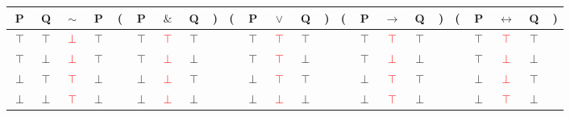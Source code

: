 \documentclass[11pt]{article}
\begin{document}
\begin{tabular}{ c  c | c  c | c  c  c  c  c | c  c  c  c  c | c  c  c  c  c | c  c  c  c  c }
P & Q & $\sim$ & P & ( & P & $\&$ & Q & ) & ( & P & $\lor$ & Q & ) & ( & P & $\rightarrow$ & Q & ) & ( & P & $\leftrightarrow$ & Q & )\\
\hline 
$\top$ & $\top$ & \textcolor{red}{$\perp$} & $\top$ &  & $\top$ & \textcolor{red}{$\top$} & $\top$ &  &  & $\top$ & \textcolor{red}{$\top$} & $\top$ &  &  & $\top$ & \textcolor{red}{$\top$} & $\top$ &  &  & $\top$ & \textcolor{red}{$\top$} & $\top$ & \\
$\top$ & $\perp$ & \textcolor{red}{$\perp$} & $\top$ &  & $\top$ & \textcolor{red}{$\perp$} & $\perp$ &  &  & $\top$ & \textcolor{red}{$\top$} & $\perp$ &  &  & $\top$ & \textcolor{red}{$\perp$} & $\perp$ &  &  & $\top$ & \textcolor{red}{$\perp$} & $\perp$ & \\
$\perp$ & $\top$ & \textcolor{red}{$\top$} & $\perp$ &  & $\perp$ & \textcolor{red}{$\perp$} & $\top$ &  &  & $\perp$ & \textcolor{red}{$\top$} & $\top$ &  &  & $\perp$ & \textcolor{red}{$\top$} & $\top$ &  &  & $\perp$ & \textcolor{red}{$\perp$} & $\top$ & \\
$\perp$ & $\perp$ & \textcolor{red}{$\top$} & $\perp$ &  & $\perp$ & \textcolor{red}{$\perp$} & $\perp$ &  &  & $\perp$ & \textcolor{red}{$\perp$} & $\perp$ &  &  & $\perp$ & \textcolor{red}{$\top$} & $\perp$ &  &  & $\perp$ & \textcolor{red}{$\top$} & $\perp$ & \\
\end{tabular}
\end{document}
